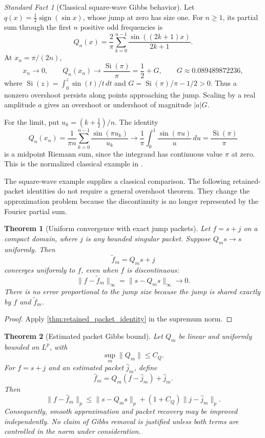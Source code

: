 \documentclass[11pt,letterpaper]{article}
\newtheorem{theorem}{Theorem}[section]
\theoremstyle{plain}
\theoremstyle{plain}
\theoremstyle{plain}
\theoremstyle{definition}
\theoremstyle{definition}
\theoremstyle{definition}
\theoremstyle{definition}
\theoremstyle{remark}
\theoremstyle{remark}
\theoremstyle{remark}
\theoremstyle{remark}
\newtheorem{standardfact}[standardfact]{Standard Fact}
\let\KomorebiPrimitiveWidehat\widehat
\renewcommand{\widehat}[1]{\KomorebiPrimitiveWidehat{#1}}
\begin{document}
\begin{standardfact}[Classical square-wave Gibbs behavior]\label{sf:gibbs_behavior}
Let \(q(x)=\tfrac12\operatorname{sign}(\sin x)\), whose jump at zero has size one. For \(n\geq1\), its partial sum through the first \(n\) positive odd frequencies is
\[
Q_n(x)=\frac{2}{\pi}\sum_{k=0}^{n-1}\frac{\sin((2k+1)x)}{2k+1}.
\]
At \(x_n=\pi/(2n)\),
\[
x_n\longrightarrow0,\qquad Q_n(x_n)\longrightarrow\frac{\operatorname{Si}(\pi)}{\pi}
=\frac12+G,\qquad G\approx0.089489872236,
\]
where \(\operatorname{Si}(z)=\int_0^z\sin(t)/t\,dt\) and \(G=\operatorname{Si}(\pi)/\pi-1/2>0\).
Thus a nonzero overshoot persists along points approaching the jump. Scaling by a real amplitude \(a\) gives an overshoot or undershoot of magnitude \(|a|G\).

For the limit, put \(u_k=(k+\tfrac12)/n\). The identity
\[
Q_n(x_n)=\frac{1}{\pi n}\sum_{k=0}^{n-1}\frac{\sin(\pi u_k)}{u_k}
\longrightarrow\frac1\pi\int_0^1\frac{\sin(\pi u)}u\,du
=\frac{\operatorname{Si}(\pi)}{\pi}
\]
is a midpoint Riemann sum, since the integrand has continuous value \(\pi\) at zero. This is the normalized classical example in \cite[Section~6.16(i), equations~6.16.1--6.16.4]{DLMFGibbs}.
\end{standardfact}

The square-wave example supplies a classical comparison. The following retained-packet identities do not require a general overshoot theorem. They change the approximation problem because the discontinuity is no longer represented by the Fourier partial sum.

\begin{theorem}[Uniform convergence with exact jump packets]\label{thm:uniform_packet_convergence}
Let \(f=s+j\) on a compact domain, where \(j\) is any bounded singular packet. Suppose \(Q_ms\to s\) uniformly. Then
\[
\widetilde f_m=Q_ms+j
\]
converges uniformly to \(f\), even when \(f\) is discontinuous:
\[
\|f-\widetilde f_m\|_\infty
=
\|s-Q_ms\|_\infty
\longrightarrow0.
\]
There is no error proportional to the jump size because the jump is shared exactly by \(f\) and \(\widetilde f_m\).
\end{theorem}

\begin{proof}
Apply \cref{thm:retained_packet_identity} in the supremum norm.
\end{proof}

\begin{theorem}[Estimated packet Gibbs bound]\label{thm:estimated_packet_gibbs}
Let \(Q_m\) be linear and uniformly bounded on \(L^p\), with
\[
\sup_m\|Q_m\|\leq C_Q.
\]
For \(f=s+j\) and an estimated packet \(\widehat j_m\), define
\[
\widehat f_m
=Q_m(f-\widehat j_m)+\widehat j_m.
\]
Then
\[
\|f-\widehat f_m\|_p
\leq
\|s-Q_ms\|_p
+(1+C_Q)\|j-\widehat j_m\|_p.
\]
Consequently, smooth approximation and packet recovery may be improved independently. No claim of Gibbs removal is justified unless both terms are controlled in the norm under consideration.
\end{theorem}
\end{document}
